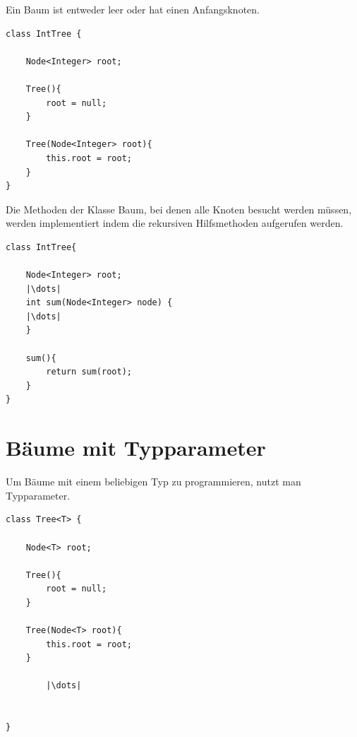 \documentclass[a4paper]{scrartcl}
\begin{document}
Ein Baum ist entweder leer oder hat einen Anfangsknoten.



\begin{verbatim}
class IntTree {

    Node<Integer> root;
    
    Tree(){
        root = null;
    }

    Tree(Node<Integer> root){
        this.root = root;
    }
}
\end{verbatim}

Die Methoden der Klasse Baum, bei denen alle Knoten besucht werden müssen, werden implementiert indem die rekursiven Hilfsmethoden aufgerufen werden.

\begin{verbatim}
class IntTree{
    
    Node<Integer> root;
    |\dots|
	int sum(Node<Integer> node) {
    |\dots|
    }

    sum(){
        return sum(root);
    }
}
\end{verbatim}


\section{Bäume mit Typparameter}
Um Bäume mit einem beliebigen Typ zu programmieren, nutzt man Typparameter.
\begin{verbatim}
class Tree<T> {

    Node<T> root;
    
    Tree(){
        root = null;
    }

    Tree(Node<T> root){
        this.root = root;
    }

        |\dots|
   

}
\end{verbatim}
\end{document}
